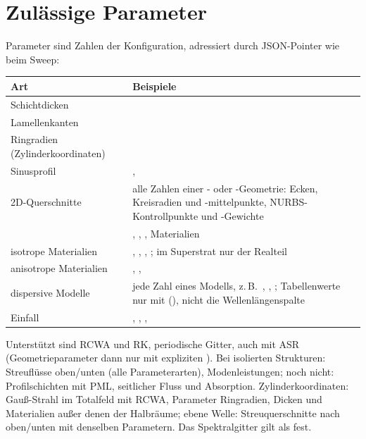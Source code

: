 \section{Zulässige Parameter}
Parameter sind Zahlen der Konfiguration, adressiert durch JSON-Pointer wie beim Sweep:
\begin{center}
\small
\begin{tabularx}{\linewidth}{lY}
\toprule
Art & Beispiele \\
\midrule
Schichtdicken &  \\
Lamellenkanten &  \\
Ringradien (Zylinderkoordinaten) &  \\
Sinusprofil & ,  \\
2D-Querschnitte & alle Zahlen einer - oder -Geometrie: Ecken, Kreisradien und -mittelpunkte,
NURBS-Kontrollpunkte und -Gewichte \\
 & , , , Materialien \\
isotrope Materialien & , , , ; im Superstrat nur der Realteil \\
anisotrope Materialien & , ,  \\
dispersive Modelle & jede Zahl eines Modells, z.\,B.\ ,
, ; Tabellenwerte nur mit
 (), nicht die Wellenlängenspalte \\
Einfall & , , ,  \\
\bottomrule
\end{tabularx}
\end{center}
Unterstützt sind RCWA und RK, periodische Gitter, auch mit ASR (Geometrieparameter dann nur mit expliziten
). Bei isolierten Strukturen: Streuflüsse oben/unten (alle Parameterarten), Modenleistungen;
noch nicht: Profilschichten mit PML, seitlicher Fluss und Absorption. Zylinderkoordinaten: Gauß-Strahl im Totalfeld
mit RCWA, Parameter Ringradien, Dicken und Materialien außer denen der Halbräume; ebene Welle: Streuquerschnitte
nach oben/unten mit denselben Parametern. Das Spektralgitter gilt als fest.

